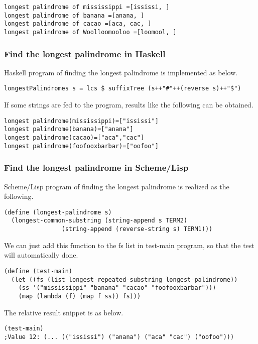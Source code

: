 \documentclass{article}
\begin{document}
\begin{verbatim}
longest palindrome of mississippi =[ississi, ]
longest palindrome of banana =[anana, ]
longest palindrome of cacao =[aca, cac, ]
longest palindrome of Woolloomooloo =[loomool, ]
\end{verbatim}

\subsubsection*{Find the longest palindrome in Haskell}
Haskell program of finding the longest palindrome is implemented as below.

\lstset{language=Haskell}
\begin{lstlisting}
longestPalindromes s = lcs $ suffixTree (s++"#"++(reverse s)++"$")
\end{lstlisting}

If some strings are fed to the program, results like the following can
be obtained.

\begin{verbatim}
longest palindrome(mississippi)=["ississi"]
longest palindrome(banana)=["anana"]
longest palindrome(cacao)=["aca","cac"]
longest palindrome(foofooxbarbar)=["oofoo"]
\end{verbatim}

\subsubsection*{Find the longest palindrome in Scheme/Lisp}
Scheme/Lisp program of finding the longest palindrome is realized as
the following.

\lstset{language=lisp}
\begin{lstlisting}
(define (longest-palindrome s)
  (longest-common-substring (string-append s TERM2) 
			    (string-append (reverse-string s) TERM1)))
\end{lstlisting}

We can just add this function to the fs list in test-main program, so
that the test will automatically done.

\begin{lstlisting}
(define (test-main)
  (let ((fs (list longest-repeated-substring longest-palindrome)) 
	(ss '("mississippi" "banana" "cacao" "foofooxbarbar")))
    (map (lambda (f) (map f ss)) fs)))
\end{lstlisting}

The relative result snippet is as below.

\begin{lstlisting}
(test-main)
;Value 12: (... (("ississi") ("anana") ("aca" "cac") ("oofoo")))
\end{lstlisting}
\end{document}
